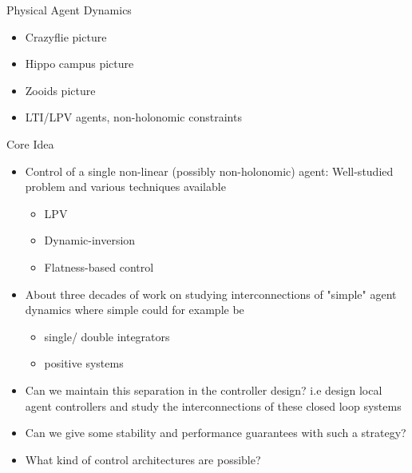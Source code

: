 \begin{frame}{Physical Agent Dynamics}	
	\begin{itemize}
		\item Crazyflie picture 
		\item Hippo campus picture
		\item Zooids picture
		\item LTI/LPV agents, non-holonomic constraints
	\end{itemize}
\end{frame}
\begin{frame}{Core Idea}	
	\begin{itemize}
		\item Control of a single non-linear (possibly non-holonomic) agent: Well-studied problem and various techniques available
		\begin{itemize}
			\item LPV
			\item Dynamic-inversion
			\item Flatness-based control
		\end{itemize}		
		\item About three decades of work on studying interconnections of "simple" agent dynamics where simple could for example be
		\begin{itemize}
			\item single/ double integrators
			\item positive systems 
		\end{itemize} 
	\item Can we maintain this separation in the controller design? i.e design local agent controllers and study the interconnections of these closed loop systems
	\item Can we give some stability and performance guarantees with such a strategy?
	\item What kind of control architectures are possible?
	\end{itemize}
\end{frame}
